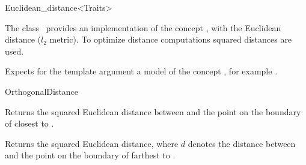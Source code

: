 

\begin{ccRefClass}{Euclidean_distance<Traits>}  %


\ccDefinition
  
The class \ccRefName\ provides an implementation of the concept , with the
Euclidean distance ($l_2$ metric).
To optimize distance computations squared distances are used.



\ccParameters

Expects for the template argument a model of the concept
, for example .

\ccIsModel

OrthogonalDistance

\ccTypes


\ccCreation
{}  %


\ccOperations
 

{Returns the squared Euclidean distance between  and
the point on the boundary of  closest to .}

{Returns the squared Euclidean distance, where $d$ denotes the distance between  and
the point on the boundary of  farthest to .}


\end{ccRefClass}
